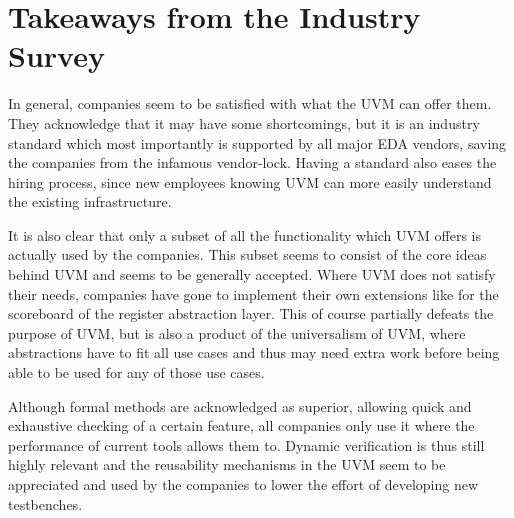 \section{Takeaways from the Industry Survey} %

In general, companies seem to be satisfied with what the UVM can offer them. They acknowledge that it may have some
shortcomings, but it is an industry standard which most importantly is supported by all major EDA vendors, saving the
companies from the infamous vendor-lock. Having a standard also eases the hiring process, since new employees knowing
UVM can more easily understand the existing infrastructure.

It is also clear that only a subset of all the functionality which UVM offers is actually used by the companies. This
subset seems to consist of the core ideas behind UVM and seems to be generally accepted. Where UVM does not satisfy
their needs, companies have gone to implement their own extensions like for the scoreboard of the register
abstraction layer. This of course partially defeats the purpose of UVM, but is also a product of the universalism of
UVM, where abstractions have to fit all use cases and thus may need extra work before being able to be used for any
of those use cases.

Although formal methods are acknowledged as superior, allowing quick and exhaustive checking of a certain feature,
all companies only use it where the performance of current tools allows them to. Dynamic verification is thus still
highly relevant and the reusability mechanisms in the UVM seem to be appreciated and used by the companies to lower
the effort of developing new testbenches.

